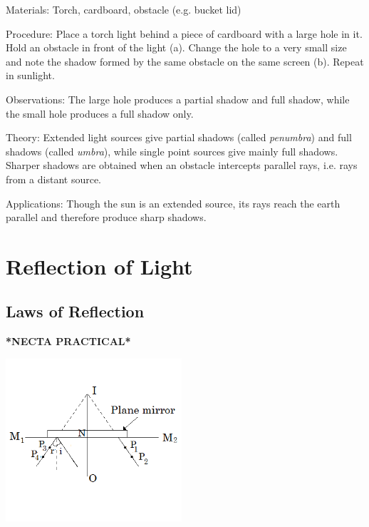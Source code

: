 \begin{multicols}{2}
\begin{description*}
\item[Materials:]{Torch, cardboard, obstacle (e.g. bucket lid)}
\item[Procedure:]{Place a torch light behind a piece of cardboard with a large hole in it. Hold an obstacle in front of the light (a). Change the hole to a very small size and note the shadow formed by the same obstacle on the same screen (b). Repeat in sunlight.}
\item[Observations:]{The large hole produces a partial shadow and full shadow, while the small hole produces a full shadow only.}
\item[Theory:]{Extended light sources give partial shadows (called \emph{penumbra}) and full shadows (called \emph{umbra}), while single point sources give mainly full shadows. Sharper shadows are obtained when an
obstacle intercepts parallel rays, i.e. rays from a distant source. }
\item[Applications:]{Though the sun is an
extended source, its rays reach the earth parallel and therefore produce sharp shadows.}
\end{description*}

\vfill
\columnbreak


\section*{Reflection of Light}


\subsection{Laws of Reflection}
\textbf{*NECTA PRACTICAL*}

\begin{center}
\includegraphics[width=0.49\textwidth]{./img/plane-mirror-prac.png}
\end{center}


\end{multicols}
